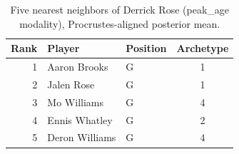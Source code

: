 \begin{table}[htbp]
  \centering\small
  \begin{tabular}{rllc}
    \toprule
    Rank & Player & Position & Archetype \\
    \midrule
    1 & Aaron Brooks & G & 1 \\
    2 & Jalen Rose & G & 1 \\
    3 & Mo Williams & G & 4 \\
    4 & Ennis Whatley & G & 2 \\
    5 & Deron Williams & G & 4 \\
    \bottomrule
  \end{tabular}
  \caption{Five nearest neighbors of Derrick Rose (peak_age modality), Procrustes-aligned posterior mean.}
  \label{tab:Derrick_Rose_neighbors_peak_age}
\end{table}

